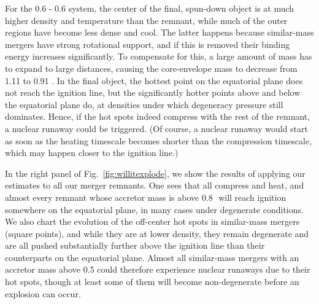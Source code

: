 For the 0.6 - 0.6 {\Msun} system, the center of the final, spun-down object is at much higher density and temperature than the remnant, while much of the outer regions have become less dense and cool.  The latter happens because similar-mass mergers have strong rotational support, and if this is removed their binding energy increases significantly.  To compensate for this, a large amount of mass has to expand to large distances, causing the core-envelope mass to decrease from 1.11 {\Msun} to 0.91 {\Msun}.  In the final object, the hottest point on the equatorial plane does not reach the ignition line, but the significantly hotter points above and below the equatorial plane do, at densities under which degeneracy pressure still dominates.  Hence, if the hot spots indeed compress with the rest of the remnant, a nuclear runaway could be triggered.  (Of course, a nuclear runaway would start as soon as the heating timescale becomes shorter than the compression timescale, which may happen closer to the ignition line.)


In the right panel of Fig.~\ref{fig:willitexplode}, we show the results of applying our estimates to all our merger remnants.  One sees that all compress and heat, and almost every remnant whose accretor mass is above 0.8\,\Msun\ will reach ignition somewhere on the equatorial plane, in many cases under degenerate conditions.  We also chart the evolution of the off-center hot spots in similar-mass mergers (square points), and while they are at lower density, they remain degenerate and are all pushed substantially further above the ignition line than their counterparts on the equatorial plane.  Almost all similar-mass mergers with an accretor mass above 0.5 {\Msun} could therefore experience nuclear runaways due to their hot spots, though at least some of them will become non-degenerate before an explosion can occur.

